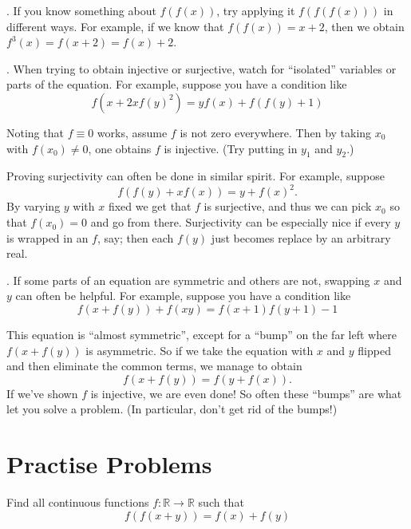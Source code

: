 \begin{itemize}
	\ii {}.
	If you know something about $f(f(x))$,
	try applying it $f(f(f(x)))$ in different ways.
	For example, if we know that $f(f(x)) = x+2$,
	then we obtain $f^3(x) = f(x+2) = f(x)+2$.

	\ii {}.
	When trying to obtain injective or surjective,
	watch for ``isolated'' variables or parts of the equation.
	For example, suppose you have a condition like
	\[ f(x+2xf(y)^2) = yf(x) + f(f(y)+1) \]
	
	Noting that $f \equiv 0$ works, assume $f$ is not zero everywhere.
	Then by taking $x_0$ with $f(x_0) \neq 0$,
	one obtains $f$ is injective.
	(Try putting in $y_1$ and $y_2$.)

	Proving surjectivity can often be done in similar spirit.
	For example, suppose
	\[ f(f(y)+xf(x)) = y+f(x)^2. \]
	By varying $y$ with $x$ fixed we get that $f$ is surjective,
	and thus we can pick $x_0$ so that $f(x_0) = 0$
	and go from there.
	Surjectivity can be especially nice if every $y$
	is wrapped in an $f$, say; then each $f(y)$ just becomes
	replace by an arbitrary real.

	\ii {}.
	If some parts of an equation are symmetric and others are not,
	swapping $x$ and $y$ can often be helpful.
	For example, suppose you have a condition like
	\[ f(x+f(y)) + f(xy) = f(x+1)f(y+1) - 1 \]

	This equation is ``almost symmetric'',
	except for a ``bump'' on the far left where $f(x+f(y))$ is asymmetric.
	So if we take the equation with $x$ and $y$ flipped
	and then eliminate the common terms,
	we manage to obtain \[ f(x+f(y)) = f(y+f(x)). \]
	If we've shown $f$ is injective, we are even done!
	So often these ``bumps'' are what let you solve a problem.
	(In particular, don't get rid of the bumps!)
\end{itemize}


\section{Practise Problems}
\begin{problem}
Find all continuous functions $f: \mathbb{R} \to \mathbb{R}$ such that $$f(f(x+y))=f(x)+f(y)$$
\begin{hint}
\end{hint}
\end{problem}

